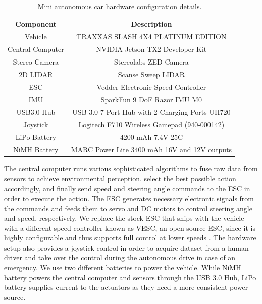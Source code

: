 \begin{table}[h]
  \begin{center}
    \caption[Hardware configuration]{Mini autonomous car hardware configuration
      details.}
    \label{table:hardware-configuration}
    \begin{tabular}{|c|c|}
      \hline
      \textbf{Component} & \textbf{Description} \\
      \hline
      Vehicle            & TRAXXAS SLASH 4X4 PLATINUM EDITION \\ 
      \hline
      Central Computer   & NVIDIA Jetson TX2 Developer Kit \\
      \hline
      Stereo Camera      & Stereolabs ZED Camera \\
      \hline
      2D LIDAR           & Scanse Sweep LIDAR \\
      \hline
      ESC                & Vedder Electronic Speed Controller \\
      \hline
      IMU                & SparkFun 9 DoF Razor IMU M0 \\
      \hline
      USB3.0 Hub         & USB 3.0 7-Port Hub with 2 Charging Ports UH720 \\
      \hline
      Joystick           & Logitech F710 Wireless Gamepad (940-000142) \\
      \hline
      LiPo Battery       & 4200 mAh 7,4V 25C \\
      \hline
      NiMH Battery       & MARC Power Lite 3400 mAh 16V and 12V outputs \\
      \hline
    \end{tabular}
  \end{center}
\end{table}

The central computer runs various sophisticated algorithms to fuse raw data
from sensors to achieve environmental perception, select the best possible
action accordingly, and finally send speed and steering angle commands to the
ESC in order to execute the action. The ESC generates necessary electronic
signals from the commands and feeds them to servo and DC motors to control
steering angle and speed, respectively. We replace the stock ESC that ships
with the vehicle with a different speed controller known as VESC, an open
source ESC, since it is highly configurable and thus supports full control at
lower speeds \cite{Vesc2015ESC}. The hardware setup also provides a joystick
control in order to acquire dataset from a human driver and take over the
control during the autonomous drive in case of an emergency. We use two
different batteries to power the vehicle. While NiMH battery powers the
central computer and sensors through the USB 3.0 Hub, LiPo battery supplies
current to the actuators as they need a more consistent power source.

